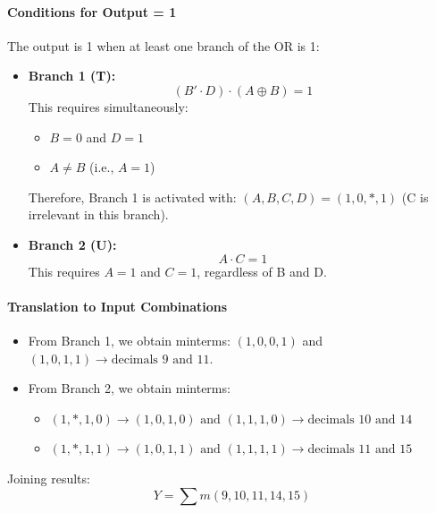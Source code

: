\documentclass[12pt]{article}  %
\begin{document}
\paragraph{Conditions for Output = 1}
The output is 1 when at least one branch of the OR is 1:
\begin{itemize}
    \item \textbf{Branch 1 (T):}
    $$(B' \cdot D) \cdot (A \oplus B) = 1$$
    This requires simultaneously:
    \begin{itemize}
        \item $B = 0$ and $D = 1$
        \item $A \neq B$ (i.e., $A=1$)
    \end{itemize}
    Therefore, Branch 1 is activated with: $(A,B,C,D) = (1,0,*,1)$ (C is irrelevant in this branch).
    \item \textbf{Branch 2 (U):}
    $$A \cdot C = 1$$
    This requires $A=1$ and $C=1$, regardless of B and D.
\end{itemize}

\paragraph{Translation to Input Combinations}
\begin{itemize}
    \item From Branch 1, we obtain minterms: $(1,0,0,1)$ and $(1,0,1,1) \rightarrow \text{decimals } 9 \text{ and } 11$.
    \item From Branch 2, we obtain minterms:
    \begin{itemize}
        \item $(1,*,1,0) \rightarrow (1,0,1,0) \text{ and } (1,1,1,0) \rightarrow \text{decimals } 10 \text{ and } 14$
        \item $(1,*,1,1) \rightarrow (1,0,1,1) \text{ and } (1,1,1,1) \rightarrow \text{decimals } 11 \text{ and } 15$
    \end{itemize}
\end{itemize}
Joining results:
$$Y = \sum m(9, 10, 11, 14, 15)$$
\end{document}

